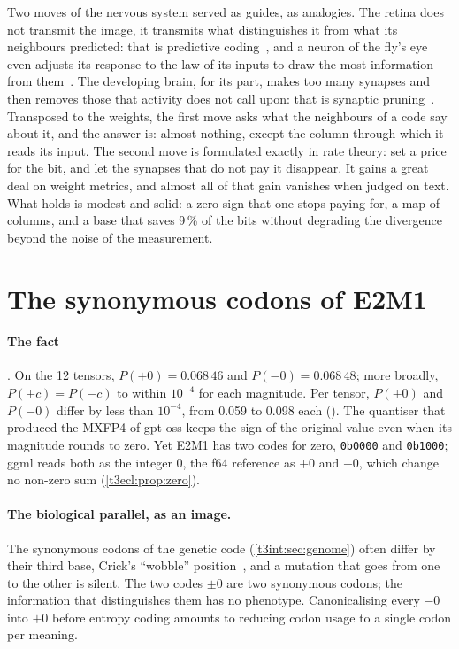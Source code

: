 \begin{enbref}
Two moves of the nervous system served as guides, as analogies. The retina does not transmit the image, it transmits what distinguishes it from what its neighbours predicted: that is predictive coding~\cite{rao1999}, and a neuron of the fly's eye even adjusts its response to the law of its inputs to draw the most information from them~\cite{genome-pe-laughlin1981}. The developing brain, for its part, makes too many synapses and then removes those that activity does not call upon: that is synaptic pruning~\cite{huttenlocher1979}. Transposed to the weights, the first move asks what the neighbours of a code say about it, and the answer is: almost nothing, except the column through which it reads its input. The second move is formulated exactly in rate theory: set a price for the bit, and let the synapses that do not pay it disappear. It gains a great deal on weight metrics, and almost all of that gain vanishes when judged on text. What holds is modest and solid: a zero sign that one stops paying for, a map of columns, and a base that saves 9\,\% of the bits without degrading the divergence beyond the noise of the measurement.
\end{enbref}

\section{The synonymous codons of E2M1}\label{t3pre:sec:codons}

\paragraph{The fact} \mes. On the 12 tensors, $P(+0) = 0.068\,46$ and $P(-0) = 0.068\,48$; more broadly, $P(+c) = P(-c)$ to within $10^{-4}$ for each magnitude. Per tensor, $P(+0)$ and $P(-0)$ differ by less than $10^{-4}$, from 0.059 to 0.098 each (). The quantiser that produced the MXFP4 of gpt-oss keeps the sign of the original value even when its magnitude rounds to zero. Yet E2M1 has two codes for zero, \texttt{0b0000} and \texttt{0b1000}; ggml reads both as the integer 0, the f64 reference as $+0$ and $-0$, which change no non-zero sum (\cref{t3ecl:prop:zero}).

\paragraph{The biological parallel, as an image.} The synonymous codons of the genetic code (\cref{t3int:sec:genome}) often differ by their third base, Crick's ``wobble'' position~\cite{genome-pe-crick1966wobble}, and a mutation that goes from one to the other is silent. The two codes $\pm0$ are two synonymous codons; the information that distinguishes them has no phenotype. Canonicalising every $-0$ into $+0$ before entropy coding amounts to reducing codon usage to a single codon per meaning.

